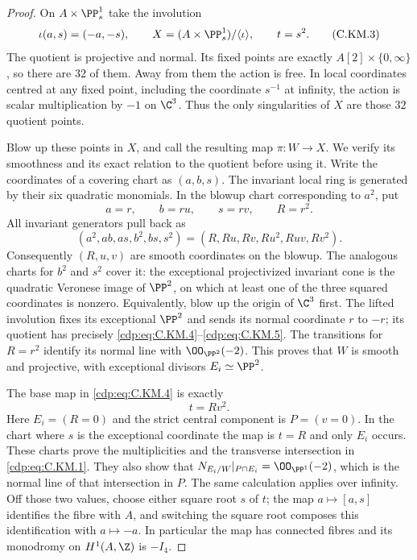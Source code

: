 \begin{proof}
On $A\times\PP^1_s$ take the involution
\[
       \iota(a,s)=(-a,-s),\qquad
 X=(A\times\PP^1_s)/\langle\iota\rangle,
       \qquad t=s^2.                                  \tag{C.KM.3}\label{cdp:eq:C.KM.3}
\]
The quotient is projective and normal. Its fixed points are
exactly $A[2]\times\{0,\infty\}$, so there are $32$ of them.
Away from them the action is free. In local coordinates centred
at any fixed point, including the coordinate $s^{-1}$ at
infinity, the action is scalar multiplication by $-1$ on
$\C^3$. Thus the only singularities of $X$ are those $32$
quotient points.

Blow up these points in $X$, and call the resulting map
$\pi:W\to X$. We verify its smoothness and its exact relation
to the quotient before using it. Write the coordinates of a
covering chart as $(a,b,s)$. The invariant local ring is
generated by their six quadratic monomials. In the blowup
chart corresponding to $a^2$, put
\[
             a=r,\qquad b=ru,\qquad s=rv,
             \qquad R=r^2.                            \tag{C.KM.4}\label{cdp:eq:C.KM.4}
\]
All invariant generators pull back as
\[
 (a^2,ab,as,b^2,bs,s^2)
           =(R,Ru,Rv,Ru^2,Ruv,Rv^2).                  \tag{C.KM.5}\label{cdp:eq:C.KM.5}
\]
Consequently $(R,u,v)$ are smooth coordinates on the blowup.
The analogous charts for $b^2$ and $s^2$ cover it: the
exceptional projectivized invariant cone is the quadratic
Veronese image of $\PP^2$, on which at least one of the
three squared coordinates is nonzero. Equivalently, blow up
the origin of $\C^3$ first. The lifted involution fixes its
exceptional $\PP^2$ and sends its normal coordinate $r$ to
$-r$; its quotient has precisely \eqref{cdp:eq:C.KM.4}--\eqref{cdp:eq:C.KM.5}.
The transitions for $R=r^2$ identify its normal line with
$\OO_{\PP^2}(-2)$. This proves that $W$ is smooth and
projective, with exceptional divisors $E_i\simeq\PP^2$.

The base map in \eqref{cdp:eq:C.KM.4} is exactly
\[
                             t=R v^2.                 \tag{C.KM.6}\label{cdp:eq:C.KM.6}
\]
Here $E_i=(R=0)$ and the strict central component is
$P=(v=0)$. In the chart where $s$ is the exceptional
coordinate the map is $t=R$ and only $E_i$ occurs.
These charts prove the multiplicities and the transverse
intersection in \eqref{cdp:eq:C.KM.1}. They also show that
$N_{E_i/W}|_{P\cap E_i}=\OO_{\PP^1}(-2)$, which is
the normal line of that intersection in $P$.
The same calculation applies over infinity. Off those two
values, choose either square root $s$ of $t$; the map
$a\mapsto[a,s]$ identifies the fibre with $A$, and switching
the square root composes this identification with $a\mapsto-a$.
In particular the map has connected fibres and its monodromy
on $H^1(A,\Z)$ is $-I_4$.


\end{proof}
